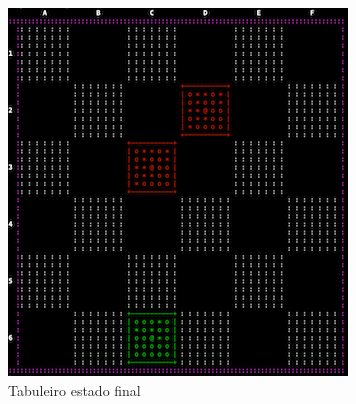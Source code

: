 \documentclass[paper=a4, fontsize=11pt]{scrartcl} %
\numberwithin{equation}{section} %
\numberwithin{figure}{section} %
\numberwithin{table}{section} %
\begin{document}
\begin{figure}[tb]
	\centering
	\includegraphics{tabuleiro_final}
	\caption[PROLOG: tabuleiro estado final]{Tabuleiro estado final} %
	\label{fig:finalstate} 
\end{figure}

\renewcommand{\refname}{\spacedlowsmallcaps{Referências}} 


\end{document}
